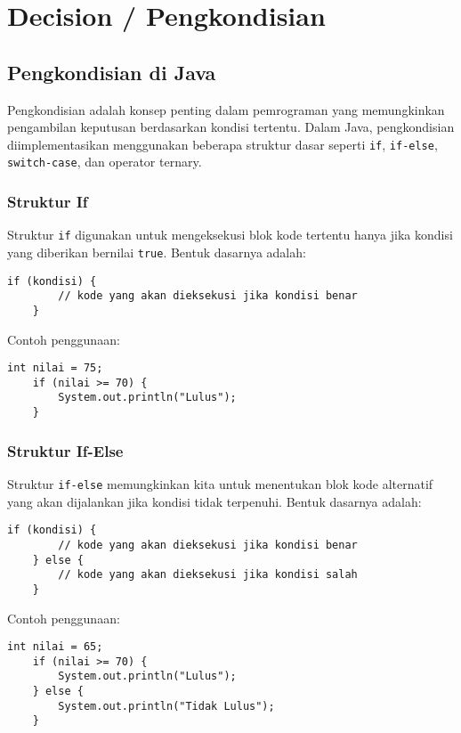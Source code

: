 \chapter{Decision / Pengkondisian}

\section{Pengkondisian di Java}

Pengkondisian adalah konsep penting dalam pemrograman yang memungkinkan pengambilan keputusan berdasarkan kondisi tertentu. Dalam Java, pengkondisian diimplementasikan menggunakan beberapa struktur dasar seperti \texttt{if}, \texttt{if-else}, \texttt{switch-case}, dan operator ternary. 

\subsection{Struktur If}

Struktur \texttt{if} digunakan untuk mengeksekusi blok kode tertentu hanya jika kondisi yang diberikan bernilai \texttt{true}. Bentuk dasarnya adalah:

\begin{lstlisting}[style=JavaStyle]
	if (kondisi) {
		// kode yang akan dieksekusi jika kondisi benar
	}
\end{lstlisting}

Contoh penggunaan:

\begin{lstlisting}[style=JavaStyle]
	int nilai = 75;
	if (nilai >= 70) {
		System.out.println("Lulus");
	}
\end{lstlisting}

\subsection{Struktur If-Else}

Struktur \texttt{if-else} memungkinkan kita untuk menentukan blok kode alternatif yang akan dijalankan jika kondisi tidak terpenuhi. Bentuk dasarnya adalah:

\begin{lstlisting}[style=JavaStyle]
	if (kondisi) {
		// kode yang akan dieksekusi jika kondisi benar
	} else {
		// kode yang akan dieksekusi jika kondisi salah
	}
\end{lstlisting}

Contoh penggunaan:

\begin{lstlisting}[style=JavaStyle]
	int nilai = 65;
	if (nilai >= 70) {
		System.out.println("Lulus");
	} else {
		System.out.println("Tidak Lulus");
	}
\end{lstlisting}


